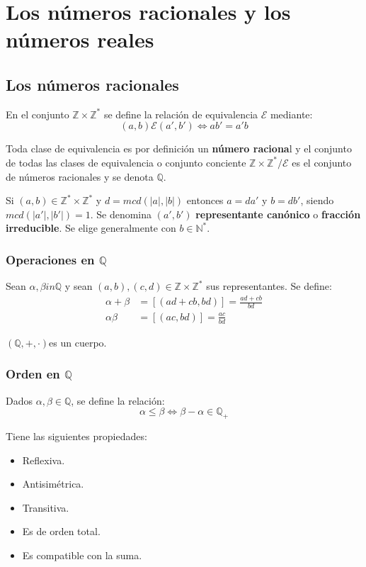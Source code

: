 \chapter{Los números racionales y los números reales}

\section{Los números racionales}

En el conjunto $\mathbb{Z} \times \mathbb{Z}^*$ se define la relación de equivalencia $\mathcal{E}$ mediante:
\[
(a,b) \mathcal{E} (a',b') \Leftrightarrow ab'=a'b
\]

Toda clase de equivalencia es por definición un \textbf{número raciona}l y el conjunto de todas las clases de equivalencia o conjunto conciente $\mathbb{Z} \times \mathbb{Z}^*/\mathcal{E}$ es el conjunto de números racionales y se denota $\mathbb{Q}$.

Si $(a,b) \in \mathbb{Z}^* \times \mathbb{Z}^*$ y $d = mcd(|a|,|b|)$ entonces $a=da'$ y $b=db'$, siendo $mcd(|a'|,|b'|)=1$. Se denomina $(a',b')$ \textbf{representante canónico} o \textbf{fracción irreducible}. Se elige generalmente con $b \in \mathbb{N}^*$.

\subsection{Operaciones en $\mathbb{Q}$}

Sean $\alpha,\beta in \mathbb{Q}$ y sean $(a,b),(c,d) \in \mathbb{Z} \times \mathbb{Z}^*$ sus representantes. Se define:
\begin{align*}
\alpha + \beta &= [(ad+cb,bd)] = \frac{ad+cb}{bd} \\
\alpha\beta &= [(ac,bd)] = \frac{ac}{bd}
\end{align*}

$(\mathbb{Q},+,\cdot)$es un cuerpo.

\subsection{Orden en $\mathbb{Q}$}

Dados $\alpha,\beta \in \mathbb{Q}$, se define la relación:
\[
\alpha \leq \beta \Leftrightarrow \beta - \alpha \in \mathbb{Q}_+
\]

Tiene las siguientes propiedades:
\begin{itemize}
	\item Reflexiva.
	\item Antisimétrica.
	\item Transitiva.
	\item Es de orden total.
	\item Es compatible con la suma.
\end{itemize}


